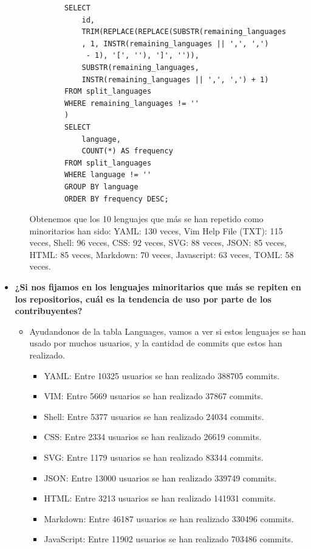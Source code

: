 \documentclass[a4paper, 12pt]{book}
\begin{document}
\begin{itemize}
\begin{itemize}
\begin{verbatim}
        SELECT 
            id,
            TRIM(REPLACE(REPLACE(SUBSTR(remaining_languages
            , 1, INSTR(remaining_languages || ',', ',')
             - 1), '[', ''), ']', '')),
            SUBSTR(remaining_languages, 
            INSTR(remaining_languages || ',', ',') + 1)
        FROM split_languages
        WHERE remaining_languages != ''
        )
        SELECT 
            language, 
            COUNT(*) AS frequency
        FROM split_languages
        WHERE language != ''
        GROUP BY language
        ORDER BY frequency DESC;
      \end{verbatim}
                Obtenemos que los 10 lenguajes que más se han repetido como minoritarios han sido: YAML: 130 veces, Vim Help File (TXT): 115 veces, Shell: 96 veces, CSS: 92 veces, SVG: 88 veces, JSON: 85 veces, HTML: 85 veces, Markdown: 70 veces, Javascript: 63 veces, TOML: 58 veces.
        \end{itemize}
  \item \textbf{¿Si nos fijamos en los lenguajes minoritarios que más se repiten en los repositorios, cuál es la tendencia de uso por parte de los contribuyentes?}
        \begin{itemize}
          \item Ayudandonos de la tabla Languages, vamos a ver si estos lenguajes se han usado por muchos usuarios, y la cantidad de commits que estos han realizado.
                \begin{itemize}
                  \item YAML: Entre 10325 usuarios se han realizado 388705 commits.
                  \item VIM: Entre 5669 usuarios se han realizado 37867 commits.
                  \item Shell: Entre 5377 usuarios se han realizado 24034 commits.
                  \item CSS: Entre 2334 usuarios se han realizado 26619 commits.
                  \item SVG: Entre 1179 usuarios se han realizado 83344 commits.
                  \item JSON: Entre 13000 usuarios se han realizado 339749 commits.
                  \item HTML: Entre 3213 usuarios se han realizado 141931 commits.
                  \item Markdown: Entre 46187 usuarios se han realizado 330496 commits.
                  \item JavaScript: Entre 11902 usuarios se han realizado 703486 commits.

\end{itemize}
\end{itemize}
\end{itemize}
\end{document}
